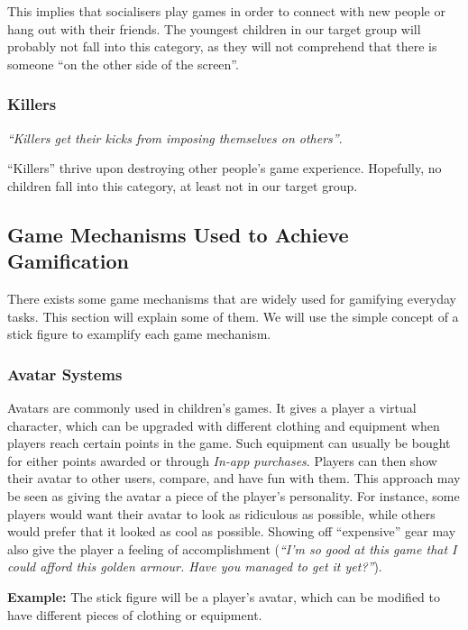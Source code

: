 This implies that socialisers play games in order to connect with new people or hang out with their friends. The youngest children in our target group will probably not fall into this category, as they will not comprehend that there is someone ``on the other side of the screen''.    

\subsubsection{Killers}
\label{sec:killers}
\textit{``Killers get their kicks from imposing themselves on others''}\cite{bartle-gamers}.

``Killers'' thrive upon destroying other people's game experience. Hopefully, no children fall into this category, at least not in our target group.

\subsection{Game Mechanisms Used to Achieve Gamification} 
\label{sec:gamemechanismsusedtoachievegamification}
There exists some game mechanisms that are widely used for gamifying everyday tasks. This section will explain some of them. We will use the simple concept of a stick figure to examplify each game mechanism. 

\subsubsection{Avatar Systems}
\label{sec:avatarsystems}
Avatars are commonly used in children's games. It gives a player a virtual character, which can be upgraded with different clothing and equipment when players reach certain points in the game. Such equipment can usually be bought for either points awarded or through \emph{In-app purchases}. Players can then show their avatar to other users, compare, and have fun with them. This approach may be seen as giving the avatar a piece of the player's personality. For instance, some players would want their avatar to look as ridiculous as possible, while others would prefer that it looked as cool as possible. Showing off ``expensive'' gear may also give the player a feeling of accomplishment (\emph{``I'm so good at this game that I could afford this golden armour. Have you managed to get it yet?''}). 

\textbf{Example:} The stick figure will be a player's avatar, which can be modified to have different pieces of clothing or equipment.  

